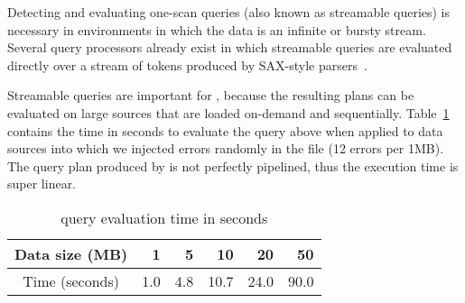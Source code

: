 Detecting and evaluating one-scan queries (also known as streamable
queries) is
necessary in \Xml{} environments in which the \Xml{} data is an
infinite or bursty stream.  Several query processors already exist in
which streamable queries are evaluated directly over a stream of
tokens produced by SAX-style
parsers~\cite{DBLP:journals/vldb/FlorescuHKLRWCS04,rose:villard:2005}.

Streamable queries are important for \padx{}, because the resulting
plans can be evaluated on large \pads{} sources that are loaded
on-demand and sequentially.  Table~\ref{tab:linear2} contains the time
in seconds to evaluate the query above when applied to \pads{} data
sources into which we injected errors randomly in the file
(12 errors per 1MB).  The query plan produced
by \Galax{} is not perfectly pipelined, thus the execution time is super
linear.  

\begin{table}
\begin{center}
\begin{tabular}{c|r|r|r|r|r}
Data size (MB) & 1  & 5 & 10 & 20 & 50  \\ \hline
Time (seconds) & 1.0 & 4.8 & 10.7 & 24.0 & 90.0 \\
\end{tabular}
\end{center}
\caption{\padx{} query evaluation time in seconds}
\label{tab:linear2}
\end{table}

